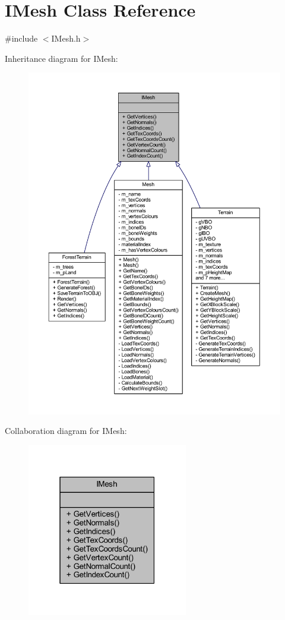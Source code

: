 \hypertarget{class_i_mesh}{}\section{I\+Mesh Class Reference}
\label{class_i_mesh}


{\ttfamily \#include $<$I\+Mesh.\+h$>$}



Inheritance diagram for I\+Mesh\+:\nopagebreak
\begin{figure}[H]
\begin{center}
\leavevmode
\includegraphics[width=350pt]{class_i_mesh__inherit__graph}
\end{center}
\end{figure}


Collaboration diagram for I\+Mesh\+:\nopagebreak
\begin{figure}[H]
\begin{center}
\leavevmode
\includegraphics[width=199pt]{class_i_mesh__coll__graph}
\end{center}
\end{figure}

